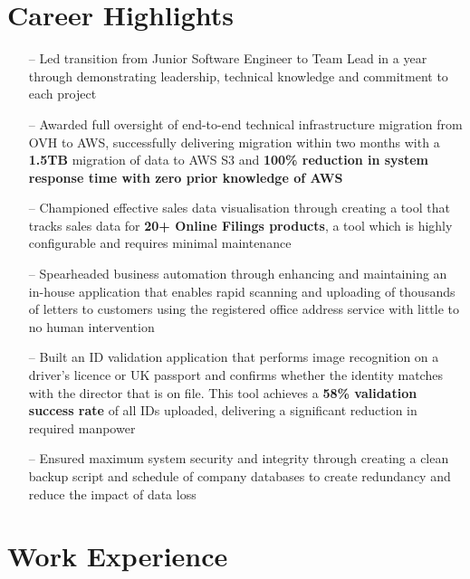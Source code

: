 \documentclass[a4paper,12pt]{article}
\begin{document}
\section{Career Highlights}
\begin{itemize}[nosep,after=\strut, leftmargin=1em, itemsep=3pt]
    \item[--] Led transition from Junior Software Engineer to Team Lead in a year through demonstrating leadership, technical knowledge and commitment to each project
    \item[--] Awarded full oversight of end-to-end technical infrastructure migration from OVH to AWS, successfully delivering migration within two months with a \textbf{1.5TB} migration of data to AWS S3 and \textbf{100\% reduction in system response time with zero prior knowledge of AWS}
    \item[--] Championed effective sales data visualisation through creating a tool that tracks sales data for \textbf{20+ Online Filings products}, a tool which is highly configurable and requires minimal maintenance
    \item[--] Spearheaded business automation through enhancing and maintaining an in-house application that enables rapid scanning and uploading of thousands of letters to customers using the registered office address service with little to no human intervention
    \item[--] Built an ID validation application that performs image recognition on a driver’s licence or UK passport and confirms whether the identity matches with the director that is on file. This tool achieves a \textbf{58\% validation success rate} of all IDs uploaded, delivering a significant reduction in required manpower
    \item[--] Ensured maximum system security and integrity through creating a clean backup script and schedule of company databases to create redundancy and reduce the impact of data loss
\end{itemize}

\section{Work Experience}
\end{document}
